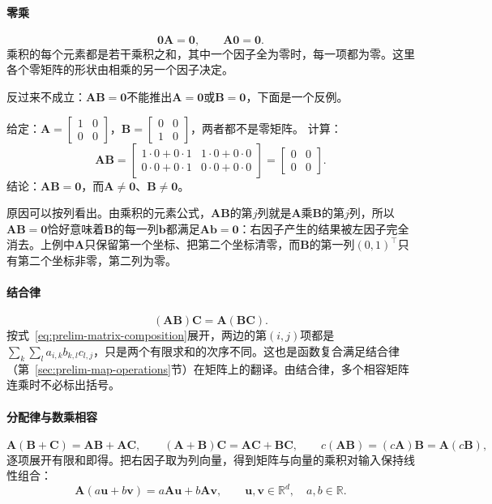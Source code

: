\paragraph{零乘}
\[
 \bm0\bm A=\bm0,\qquad\bm A\bm0=\bm0.
\]
乘积的每个元素都是若干乘积之和，其中一个因子全为零时，每一项都为零。这里各个零矩阵的形状由相乘的另一个因子决定。

反过来不成立：$\bm A\bm B=\bm0$不能推出$\bm A=\bm0$或$\bm B=\bm0$，下面是一个反例。
\begin{example}[反例：两个非零矩阵的乘积为零]
\label{ex:ls-zero-product-nonzero-factors}
给定：$\bm A=\left[\begin{smallmatrix}1&0\\0&0\end{smallmatrix}\right]$，$\bm B=\left[\begin{smallmatrix}0&0\\1&0\end{smallmatrix}\right]$，两者都不是零矩阵。
计算：
\[
 \bm A\bm B=\begin{bmatrix}1\cdot0+0\cdot1&1\cdot0+0\cdot0\\0\cdot0+0\cdot1&0\cdot0+0\cdot0\end{bmatrix}=\begin{bmatrix}0&0\\0&0\end{bmatrix}.
\]
结论：$\bm A\bm B=\bm0$，而$\bm A\neq\bm0$、$\bm B\neq\bm0$。
\end{example}
原因可以按列看出。由乘积的元素公式，$\bm A\bm B$的第$j$列就是$\bm A$乘$\bm B$的第$j$列，所以$\bm A\bm B=\bm0$恰好意味着$\bm B$的每一列$\bm b$都满足$\bm A\bm b=\bm0$：右因子产生的结果被左因子完全消去。上例中$\bm A$只保留第一个坐标、把第二个坐标清零，而$\bm B$的第一列$(0,1)^\top$只有第二个坐标非零，第二列为零。

\paragraph{结合律}
\[
 (\bm A\bm B)\bm C=\bm A(\bm B\bm C).
\]
按式~\eqref{eq:prelim-matrix-composition}展开，两边的第$(i,j)$项都是$\sum_k\sum_l a_{i,k}b_{k,l}c_{l,j}$，只是两个有限求和的次序不同。这也是函数复合满足结合律（第~\ref{sec:prelim-map-operations}节）在矩阵上的翻译。由结合律，多个相容矩阵连乘时不必标出括号。

\paragraph{分配律与数乘相容}
\[
 \bm A(\bm B+\bm C)=\bm A\bm B+\bm A\bm C,\qquad
 (\bm A+\bm B)\bm C=\bm A\bm C+\bm B\bm C,\qquad
 c(\bm A\bm B)=(c\bm A)\bm B=\bm A(c\bm B),
\]
逐项展开有限和即得。把右因子取为列向量，得到矩阵与向量的乘积对输入保持线性组合：
\begin{equation}
 \bm A(a\bm u+b\bm v)=a\bm A\bm u+b\bm A\bm v,
 \qquad\bm u,\bm v\in\mathbb R^d,\quad a,b\in\mathbb R.
 \label{eq:prelim-matrix-linearity}
\end{equation}

